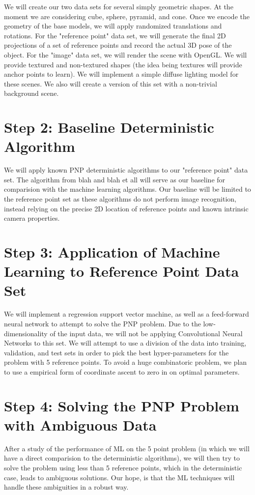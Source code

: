 \documentclass[journal]{IEEEtran}
\begin{document}
We will create our two data sets for several simply geometric shapes. At the moment we are considering cube, sphere, pyramid, and cone.
Once we encode the geometry of the base models, we will apply randomized translations and rotations. For the "reference point" data set,
we will generate the final 2D projections of a set of reference points and record the actual 3D pose of the object. For the "image" data set,
we will render the scene with OpenGL. We will provide textured and non-textured shapes (the idea being textures will provide anchor points
to learn). We will implement a simple diffuse lighting model for these scenes. We also will create a version of this set with a non-trivial background scene.

\section{Step 2: Baseline Deterministic Algorithm}

We will apply known PNP deterministic algorithms to our "reference point" data set. The algorithm from blah and blah et all will serve as our baseline for comparision
with the machine learning algorithms. Our baseline will be limited to the reference point set as these algorithms do not perform image recognition, instead relying on the
precise 2D location of reference points and known intrinsic camera properties.

\section{Step 3: Application of Machine Learning to Reference Point Data Set}

We will implement a regression support vector machine, as well as a feed-forward neural network to attempt to solve the PNP problem. Due to the low-dimensionality
of the input data, we will not be applying Convolutional Neural Networks to this set. We will attempt to use a division of the data into training, validation, and test
sets in order to pick the best hyper-parameters for the problem with 5 reference points. To avoid a huge combinatoric problem, we plan to use a empirical form of
coordinate ascent to zero in on optimal parameters.

\section{Step 4: Solving the PNP Problem with Ambiguous Data}

After a study of the performance of ML on the 5 point problem (in which we will have a direct comparision to the deterministic algorithms), we will then try to solve
the problem using less than 5 reference points, which in the deterministic case, leads to ambiguous solutions. Our hope, is that the ML techniques will handle these
ambiguities in a robust way.
\end{document}
